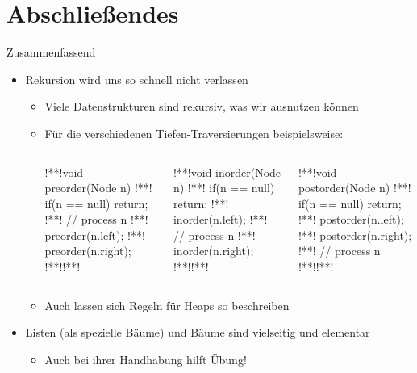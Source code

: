 \section{Abschließendes}
{\SummaryFrame
\begin{frame}[fragile,t]{Zusammenfassend}
{}
\vfill\vfill %
\begin{itemize}[<+(1)->]
    \itemsep8pt
    \item Rekursion wird uns so schnell nicht verlassen \begin{itemize}
        \item Viele Datenstrukturen sind rekursiv, was wir ausnutzen können
        \item Für die verschiedenen Tiefen-Traversierungen beispielsweise:
\begin{columns}[onlytextwidth,c]
\begin{plainjava}
!**!void preorder(Node n) {
!**!    if(n == null) return;
!**!    // process n
!**!    preorder(n.left);
!**!    preorder(n.right);
!**!}!**!
\end{plainjava}
\begin{plainjava}
!**!void inorder(Node n) {
!**!    if(n == null) return;
!**!    inorder(n.left);
!**!    // process n
!**!    inorder(n.right);
!**!}!**!
\end{plainjava}
\begin{plainjava}
!**!void postorder(Node n) {
!**!    if(n == null) return;
!**!    postorder(n.left);
!**!    postorder(n.right);
!**!    // process n
!**!}!**!
\end{plainjava}
\end{columns}
    \item Auch lassen sich Regeln für Heaps so beschreiben
    \end{itemize}
    \item Listen (als spezielle Bäume) und Bäume sind vielseitig und elementar \begin{itemize}
        \item Auch bei ihrer Handhabung hilft Übung!
    \end{itemize}
\end{itemize}
\end{frame}
}

